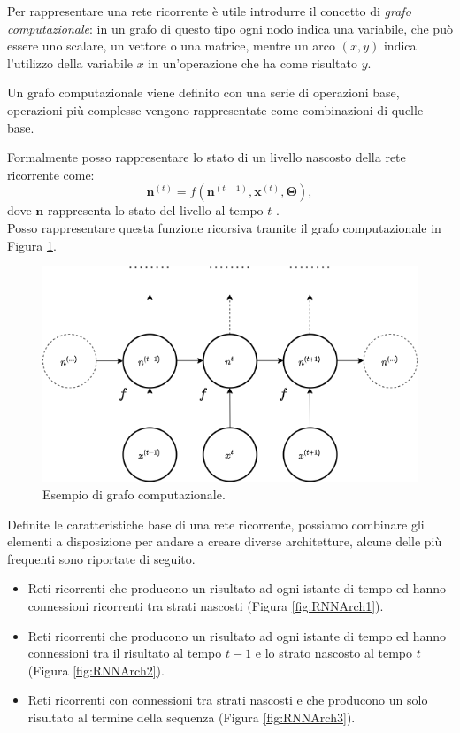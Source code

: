 \documentclass[../../main.tex]{subfiles}
\begin{document}
Per rappresentare una rete ricorrente è utile introdurre il concetto di \textit{grafo computazionale}: in un grafo di questo tipo ogni nodo indica una variabile, che può essere uno scalare, un vettore o una matrice, mentre un arco $(x,y)$ indica l'utilizzo della variabile $x$ in un'operazione che ha come risultato $y$.

Un grafo computazionale viene definito con una serie di operazioni base, operazioni più complesse vengono rappresentate come combinazioni di quelle base.

Formalmente posso rappresentare lo stato di un livello nascosto della rete ricorrente come:
\[\boldsymbol{n}^{(t)} = f(\boldsymbol{n}^{(t-1)}, \boldsymbol{x}^{(t)}, \boldsymbol{\Theta}),\]
dove $\boldsymbol{n}$ rappresenta lo stato del livello al tempo $t$ .\\
Posso rappresentare questa funzione ricorsiva tramite il grafo computazionale in Figura \ref{fig:computationgraph}.
\begin{figure}[H]
    \centering
    \includegraphics[scale = 0.4]{immagini/4_2/computation_graph.png}
    \caption{Esempio di grafo computazionale.}
    \label{fig:computationgraph}
\end{figure}

Definite le caratteristiche base di una rete ricorrente, possiamo combinare gli elementi a disposizione per andare a creare diverse architetture, alcune delle più frequenti sono riportate di seguito.

\begin{itemize}
    \item Reti ricorrenti che producono un risultato ad ogni istante di tempo ed hanno connessioni ricorrenti tra strati nascosti (Figura \ref{fig:RNNArch1}).
    \item Reti ricorrenti che producono un risultato ad ogni istante di tempo ed hanno connessioni tra il risultato al tempo $t-1$ e lo strato nascosto al tempo $t$ (Figura \ref{fig:RNNArch2}).
    \item Reti ricorrenti con connessioni tra strati nascosti e che producono un solo risultato al termine della sequenza (Figura \ref{fig:RNNArch3}).
\end{itemize}
\end{document}
